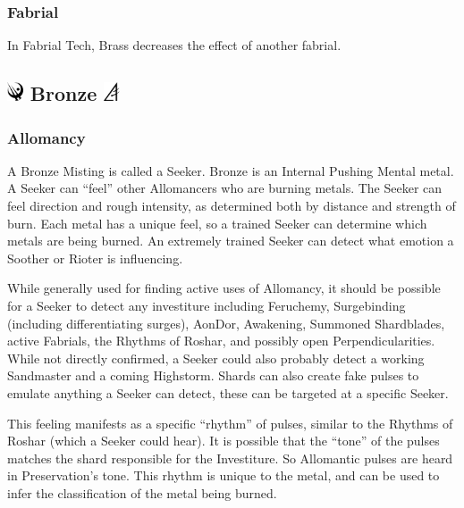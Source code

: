 \documentclass[conference]{IEEEtran}
\newcommand{\n}{\hfill\break}
\begin{document}
\subsubsection*{\textbf{Fabrial}}
In Fabrial Tech, Brass decreases the effect of another fabrial.\cite{RoW-E7} 
\n
\subsection*{\includegraphics[height=1em]{images/Bronze.png}  \textbf{Bronze} \includegraphics[height=1em]{images/Bronze_(Feruchemy).png}}
\subsubsection*{\textbf{Allomancy}}
A Bronze Misting is called a Seeker.\cite{ARS}  Bronze is an Internal Pushing Mental metal. \cite{AL-TB}
A Seeker can ``feel'' other Allomancers who are burning metals.\cite{ARS}  The Seeker can feel direction and rough intensity, as determined both by distance and strength of burn.\cite{TFE-CH20}  Each metal has a unique feel, so a trained Seeker can determine which metals are being burned.  An extremely trained Seeker can detect what emotion a Soother or Rioter is influencing. \cite{TFE-CH20}

While generally used for finding active uses of Allomancy, it should be possible for a Seeker to detect any investiture\cite{seek-univeral} including Feruchemy,\cite{seek-FE}\cite{TLM-CH25} Surgebinding (including differentiating surges),\cite{seek-surge} AonDor,\cite{seek-aone} Awakening,\cite{seek-aone} Summoned Shardblades,\cite{seek-shard} active Fabrials,\cite{OB-CH69}\cite{seeker-spren} the Rhythms of Roshar,\cite{seek-rythem} and possibly open Perpendicularities.\cite{HoA-CH37}  While not directly confirmed, a Seeker could also probably detect a working Sandmaster and a coming Highstorm.  Shards can also create fake pulses to emulate anything a Seeker can detect,\cite{HoA-CH37}\cite{HoA-CH38} these can be targeted at a specific Seeker.\cite{HoA-CH38}

This feeling manifests as a specific ``rhythm'' of pulses,\cite{TFE-CH20} similar to the Rhythms of Roshar (which a Seeker could hear).\cite{listner-seeker}\cite{seek-rythem}  It is possible that the ``tone'' of the pulses matches the shard responsible for the Investiture.\cite{shard-lengh}\cite{pure-tone}  So Allomantic pulses are heard in Preservation's tone.  This rhythm is unique to the metal, and can be used to infer the classification of the metal being burned.\cite{TFE-CH20}
\end{document}

